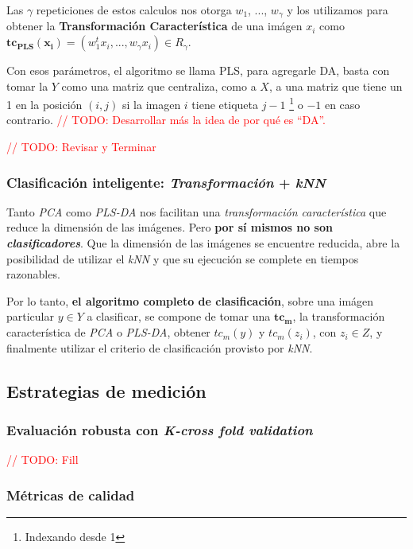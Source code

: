 Las $\gamma$ repeticiones de estos calculos nos otorga $w_{1}$, ..., $w_{\gamma}$ y los utilizamos para obtener la \textbf{Transformaci\'on Caracter\'istica} de una im\'agen $x_{i}$ como $\mathbf{tc_{PLS}(x_{i})} = (w_{1}^{t}x_{i}, ..., w_{\gamma}x_{i}) \in R_{\gamma}$.

Con esos par\'ametros, el algoritmo se llama PLS, para agregarle DA, basta con tomar la $Y$ como una matriz que centraliza, como a $X$, a una matriz que tiene un 1 en la posici\'on $(i, j)$ si la imagen $i$ tiene etiqueta $j-1$ \footnote{Indexando desde 1} o $-1$ en caso contrario. \textcolor{red}{// TODO: Desarrollar m\'as la idea de por qu\'e es ``DA''.}

\textcolor{red}{// TODO: Revisar y Terminar}

\subsubsection{Clasificaci\'on inteligente: \textit{Transformaci\'on} + \textit{kNN}}

Tanto \textit{PCA} como \textit{PLS-DA} nos facilitan una \textit{transformaci\'on caracter\'istica} que reduce la dimensi\'on de las im\'agenes. Pero \textbf{por s\'i mismos no son \textit{clasificadores}}. Que la dimensi\'on de las im\'agenes se encuentre reducida, abre la posibilidad de utilizar el \textit{kNN} y que su ejecuci\'on se complete en tiempos razonables.

Por lo tanto, \textbf{el algoritmo completo de clasificaci\'on}, sobre una im\'agen particular $y \in Y$ a clasificar, se compone de tomar una $\mathbf{tc_{m}}$, la transformaci\'on caracter\'istica de \textit{PCA} o \textit{PLS-DA}, obtener $tc_{m}(y)$ y $tc_{m}(z_{i})$, con $z_{i} \in Z$, y finalmente utilizar el criterio de clasificaci\'on provisto por \textit{kNN}.

\subsection{Estrategias de medici\'on}

\subsubsection{Evaluaci\'on robusta con \textit{K-cross fold validation}}

\textcolor{red}{// TODO: Fill}

\subsubsection{M\'etricas de calidad}

